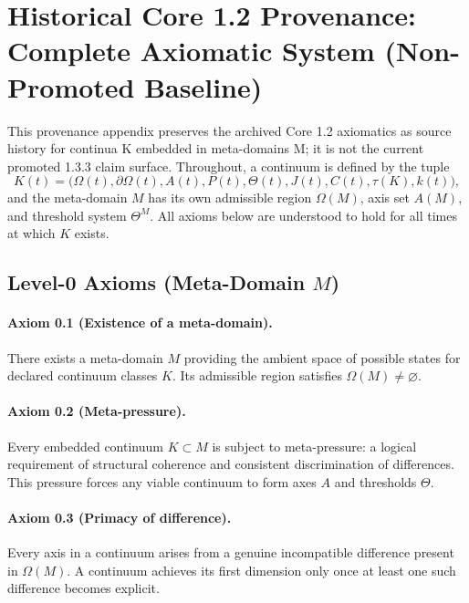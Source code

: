 \section{Historical Core 1.2 Provenance: Complete Axiomatic System (Non-Promoted Baseline)}
\label{sec:axioms-full}

This provenance appendix preserves the archived Core 1.2 axiomatics as source history for continua K embedded in meta-domains M; it is not the current promoted 1.3.3 claim surface.
Throughout, a continuum is defined by the tuple
\[
  K(t) = \bigl(\Omega(t),\partial\Omega(t),A(t),P(t),\Theta(t),J(t),C(t),\tau(K),k(t)\bigr),
\]
and the meta-domain \(M\) has its own admissible region \(\Omega(M)\), axis set \(A(M)\), and threshold system \(\Theta^M\).
All axioms below are understood to hold for all times at which \(K\) exists.

\subsection{Level-0 Axioms (Meta-Domain \texorpdfstring{\(M\)}{M})}

\paragraph{Axiom 0.1 (Existence of a meta-domain).}
There exists a meta-domain \(M\) providing the ambient space of possible states for declared continuum classes \(K\).
Its admissible region satisfies \(\Omega(M)\neq \varnothing\).

\paragraph{Axiom 0.2 (Meta-pressure).}
Every embedded continuum \(K\subset M\) is subject to meta-pressure: a logical requirement of structural coherence and consistent discrimination of differences.
This pressure forces any viable continuum to form axes \(A\) and thresholds \(\Theta\).

\paragraph{Axiom 0.3 (Primacy of difference).}
Every axis in a continuum arises from a genuine incompatible difference present in \(\Omega(M)\).
A continuum achieves its first dimension only once at least one such difference becomes explicit.

